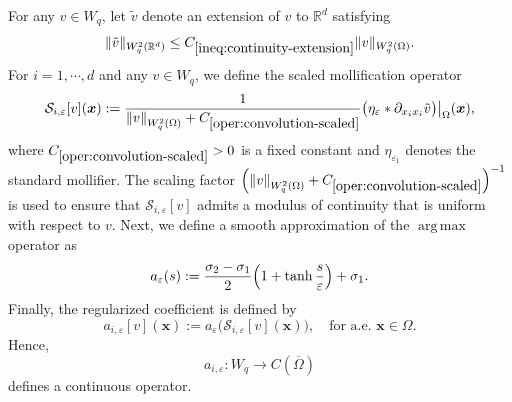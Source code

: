 \documentclass[final,onefignum,onetabnum]{mousaviart}
\newcounter{example}
\begin{document}

	\begin{example}
			For any $v \in W_q$, let $\tilde{v}$ denote an extension of $v$ to $\mathbb{R}^d$ satisfying
		\begin{equation}
			\label{ineq:continuity-extension}
			\|\tilde{v}\|_{W^{2}_q(\mathbb{R}^d)} \le C_{\ref{ineq:continuity-extension}} \|v\|_{W^{2}_q(\Omega)}.
		\end{equation}
		For $i= 1, \cdots, d$ and any $v \in W_q$, we define the scaled mollification operator
		\begin{equation}
			\label{oper:convolution-scaled}
			\mathcal{S}_{i,\varepsilon}[v](\boldsymbol{x}) :=\frac{1}{\left\| v \right\|_{W^{2}_q(\Omega)} + C_{\ref{oper:convolution-scaled}} } \bigl( \eta_{\varepsilon} \ast \partial_{x_i x_i} \tilde{v} \bigr) \big|_{\Omega} (\boldsymbol{x}),
		\end{equation}
		{\color{red} where $C_{\ref{oper:convolution-scaled}}>0$ is a fixed constant} and $\eta_{\varepsilon_1}$ denotes the standard mollifier.
		The scaling factor $\left( \left\| v \right\|_{W^{2}_q(\Omega)} + C_{\ref{oper:convolution-scaled}} \right)^{-1}$ is used to ensure that	$\mathcal{S}_{i, \varepsilon}[v]$ admits a modulus of continuity that is uniform with respect to $v$.
		Next, we define a smooth approximation of the $\operatorname{arg\,max}$ operator as
		\begin{equation}
			\label{oper:argmax-approximation}
			a_{\varepsilon}(s) := \frac{\sigma_2 - \sigma_1}{2} \Bigl( 1 + \tanh \frac{s}{\varepsilon} \Bigr) 
			+
			\sigma_1.
		\end{equation}
			Finally, the regularized coefficient is defined by
		\begin{equation}
			\label{oper:regularized-coefficient-convolution}
			a_{i,\varepsilon}[v](\boldsymbol{x}) := a_{\varepsilon}\bigl(\mathcal{S}_{i,\varepsilon}[v](\boldsymbol{x})\bigr), 
			\quad \text{for a.e. } \boldsymbol{x} \in \Omega.
		\end{equation}
	{\color{red}
		Hence,
		\[
		a_{i,\varepsilon}: W_q \rightarrow C(\overline{\Omega})
		\]
		defines a continuous operator.
	}

\end{example}
\end{document}

